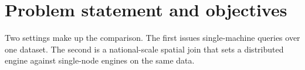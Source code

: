 \section{Problem statement and objectives}
\label{introduction:problem-statement-and-objectives}
Two settings make up the comparison. The first issues single-machine queries over one dataset. The second is a national-scale spatial join that sets a distributed engine against single-node engines on the same data.